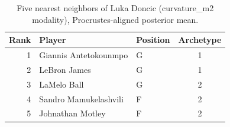 \begin{table}[htbp]
  \centering\small
  \begin{tabular}{rllc}
    \toprule
    Rank & Player & Position & Archetype \\
    \midrule
    1 & Giannis Antetokounmpo & G & 1 \\
    2 & LeBron James & G & 1 \\
    3 & LaMelo Ball & G & 2 \\
    4 & Sandro Mamukelashvili & F & 2 \\
    5 & Johnathan Motley & F & 2 \\
    \bottomrule
  \end{tabular}
  \caption{Five nearest neighbors of Luka Doncic (curvature_m2 modality), Procrustes-aligned posterior mean.}
  \label{tab:Luka_Doncic_neighbors_curvature_m2}
\end{table}

